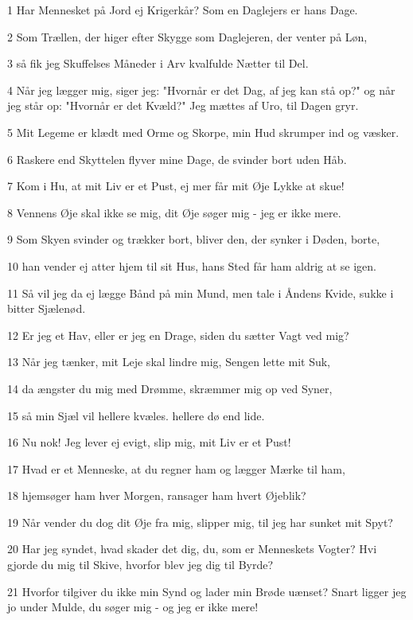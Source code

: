 \par 1 Har Mennesket på Jord ej Krigerkår? Som en Daglejers er hans Dage.
\par 2 Som Trællen, der higer efter Skygge som Daglejeren, der venter på Løn,
\par 3 så fik jeg Skuffelses Måneder i Arv kvalfulde Nætter til Del.
\par 4 Når jeg lægger mig, siger jeg: "Hvornår er det Dag, af jeg kan stå op?" og når jeg står op: "Hvornår er det Kvæld?" Jeg mættes af Uro, til Dagen gryr.
\par 5 Mit Legeme er klædt med Orme og Skorpe, min Hud skrumper ind og væsker.
\par 6 Raskere end Skyttelen flyver mine Dage, de svinder bort uden Håb.
\par 7 Kom i Hu, at mit Liv er et Pust, ej mer får mit Øje Lykke at skue!
\par 8 Vennens Øje skal ikke se mig, dit Øje søger mig - jeg er ikke mere.
\par 9 Som Skyen svinder og trækker bort, bliver den, der synker i Døden, borte,
\par 10 han vender ej atter hjem til sit Hus, hans Sted får ham aldrig at se igen.
\par 11 Så vil jeg da ej lægge Bånd på min Mund, men tale i Åndens Kvide, sukke i bitter Sjælenød.
\par 12 Er jeg et Hav, eller er jeg en Drage, siden du sætter Vagt ved mig?
\par 13 Når jeg tænker, mit Leje skal lindre mig, Sengen lette mit Suk,
\par 14 da ængster du mig med Drømme, skræmmer mig op ved Syner,
\par 15 så min Sjæl vil hellere kvæles. hellere dø end lide.
\par 16 Nu nok! Jeg lever ej evigt, slip mig, mit Liv er et Pust!
\par 17 Hvad er et Menneske, at du regner ham og lægger Mærke til ham,
\par 18 hjemsøger ham hver Morgen, ransager ham hvert Øjeblik?
\par 19 Når vender du dog dit Øje fra mig, slipper mig, til jeg har sunket mit Spyt?
\par 20 Har jeg syndet, hvad skader det dig, du, som er Menneskets Vogter? Hvi gjorde du mig til Skive, hvorfor blev jeg dig til Byrde?
\par 21 Hvorfor tilgiver du ikke min Synd og lader min Brøde uænset? Snart ligger jeg jo under Mulde, du søger mig - og jeg er ikke mere!

